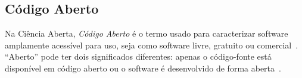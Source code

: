 \begin{comment}

\begin{table}[tbp]

\begin{tcolorbox}[colback=white,title=Definições da Ciência Aberta]
\begin{description}
    \item[Dados Abertos.] Dados online, gratuitos e acessíveis que podem ser usados, reutilizados e distribuídos desde que a fonte de dados seja atribuída.
\end{description}
\begin{description}
    \item[Acesso Aberto.] Acesso online e gratuito a conteúdo científico revisado por pares com direitos autorais limitados e restrições de licenciamento.
    \item[Código Aberto.]
    Software amplamente acessível para uso, seja como software livre, gratuito ou comercial.
    \item[Software Livre.]
    Software disponibilizado com licenças atribuídas que permitem ao usuário leitura, execução, adaptação e distribuição.
    \item[Pesquisa Reprodutível Aberta.]  
    Ato de praticar Ciência Aberta e oferecer acesso gratuito a elementos experimentais para reprodução de pesquisas.
\end{description}
\end{tcolorbox}

\end{table}
\end{comment}


\subsection{Código Aberto}

Na Ciência Aberta, 
\textit{Código Aberto} é o termo usado para caracterizar software amplamente acessível para uso, seja como software livre, gratuito ou comercial~\cite{training:handbook}.
%
``Aberto'' pode ter dois significados diferentes: apenas o código-fonte está disponível em código aberto ou o software é desenvolvido de forma aberta~\cite{herman:2022}.

